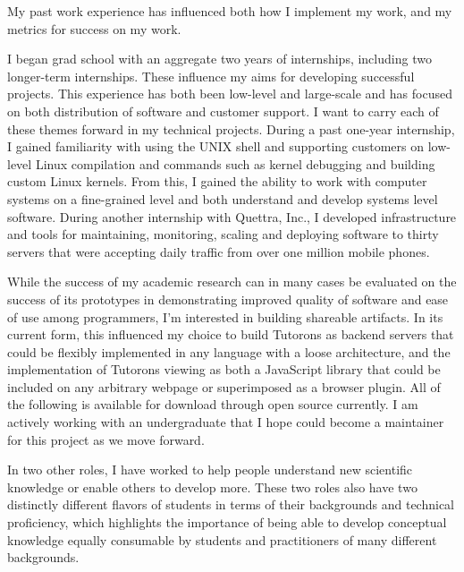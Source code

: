 \documentclass[12pt]{memoir}
\begin{document}


My past work experience has influenced both how I implement my work, and my metrics for success on my work.

I began grad school with an aggregate two years of internships, including two longer-term internships. 
These influence my aims for developing successful projects.
This experience has both been low-level and large-scale and has focused on both distribution of software and customer support.
I want to carry each of these themes forward in my technical projects.
During a past one-year internship, I gained familiarity with using the UNIX shell and supporting customers on low-level Linux compilation and commands such as kernel debugging and building custom Linux kernels.
From this, I gained the ability to work with computer systems on a fine-grained level and both understand and develop systems level software.
During another internship with Quettra, Inc., I developed infrastructure and tools for maintaining, monitoring, scaling and deploying software to thirty servers that were accepting daily traffic from over one million mobile phones.

While the success of my academic research can in many cases be evaluated on the success of its prototypes in demonstrating improved quality of software and ease of use among programmers, I'm interested in building shareable artifacts.
In its current form, this influenced my choice to build Tutorons as backend servers that could be flexibly implemented in any language with a loose architecture, and the implementation of Tutorons viewing as both a JavaScript library that could be included on any arbitrary webpage or superimposed as a browser plugin.
All of the following is available for download through open source currently.
I am actively working with an undergraduate that I hope could become a maintainer for this project as we move forward.

In two other roles, I have worked to help people understand new scientific knowledge or enable others to develop more.
These two roles also have two distinctly different flavors of students in terms of their backgrounds and technical proficiency, which highlights the importance of being able to develop conceptual knowledge equally consumable by students and practitioners of many different backgrounds.
\end{document}
